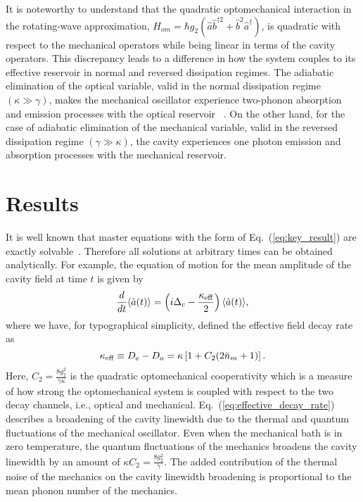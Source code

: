 \documentclass[pra,aps,showpacs,twocolumn,floatfix, superscriptaddress, nofootinbib, nobibnotes]{revtex4-1}
\begin{document}
It is noteworthy to understand that the quadratic optomechanical interaction in the rotating-wave approximation, $H_{om}=\hbar g_2(\hat a\hat b^{\dag 2} +\hat b^2 \hat a^{\dag})$, is quadratic with respect to the mechanical operators while being linear in terms of the cavity operators. This discrepancy leads to a difference in how the system couples to its effective reservoir in normal and reversed dissipation regimes. The adiabatic elimination of the optical variable, valid in the normal dissipation regime $(\kappa\gg\gamma)$, makes the mechanical oscillator experience two-phonon absorption and emission processes with the optical reservoir ~\cite{PhysRevA.95.053844}. On the other hand, for the case of adiabatic elimination of the mechanical variable, valid in the reversed dissipation regime $(\gamma\gg\kappa)$, the cavity experiences one photon emission and absorption processes with the mechanical reservoir.




\section{Results}
\label{sec:Results}
It is well known that master equations with the form of Eq.~(\ref{eq:key_result}) are exactly solvable~\cite{Pierre_book}. Therefore all solutions at arbitrary times can be obtained analytically. For example, the equation of motion for the mean amplitude of the cavity field at time $t$ is given by
\begin{equation}
 \frac{d}{dt}\langle \hat a(t) \rangle= \left(i\Delta_c-\frac{\kappa_{\rm eff}}{2}\right)\langle \hat a(t) \rangle,
 \label{eq:field_amplitude}
\end{equation}
where we have, for typographical simplicity, defined the effective field decay rate as
\begin{equation}
 \kappa_{\rm eff} \equiv D_e-D_a = \kappa\left[1+C_2(2\bar n_m+1)\right]. 
 \label{eq:effective_decay_rate}
\end{equation}
Here, $C_2=\frac{8g_2^2}{\gamma\kappa}$ is the quadratic optomechanical cooperativity which is a measure of how strong the optomechanical system is coupled with respect to the two decay channels, i.e., optical and mechanical. Eq.~(\ref{eq:effective_decay_rate}) describes a broadening of the cavity linewidth due to the thermal and quantum fluctuations of the mechanical oscillator. Even when the mechanical bath is in zero temperature, the quantum fluctuations of the mechanics broadens the cavity linewidth by an amount of $\kappa C_2=\frac{8g_2^2}{\gamma}$. The added contribution of the thermal noise of the mechanics on the cavity linewidth broadening is proportional to the mean phonon number of the mechanics. 
\end{document}
